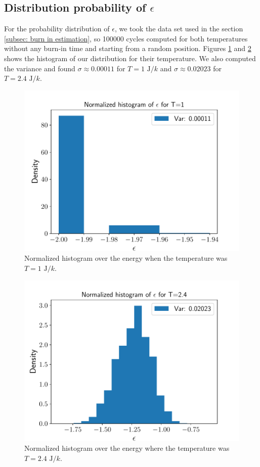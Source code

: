 \documentclass[english,notitlepage,reprint,nofootinbib]{revtex4-2}  %
\begin{document}
	\subsection{Distribution probability of $\epsilon$}\label{subsec:dist probability}

	For the probability distribution of $\epsilon$, we took the data set used in the section
	\ref{subsec: burn in estimation}, so 100000 cycles computed for both temperatures
	without any burn-in time and starting from a random position. Figures \ref{fig:hist1} and \ref{fig:hist2} shows the histogram of our distribution for their temperature.
	We also computed the variance and found $\sigma\approx0.00011$ for $T=1 \text{ J}/k$ and
	$\sigma\approx0.02023$ for $T=2.4 \text{ J}/k$.

	\begin{figure}[h!]
		\centering
		\includegraphics[scale=0.55]{figures/Histo_T1.pdf}
		\caption{Normalized histogram over the energy when the temperature was $T=1 \text{ J}/k$.}
		\label{fig:hist1}
	\end{figure}

	\begin{figure}[h!]
		\centering
		\includegraphics[scale=0.55]{figures/Histo_T2.pdf}
		\caption{Normalized histogram over the energy where the temperature was $T=2.4 \text{ J}/k$.}
		\label{fig:hist2}
	\end{figure}
\end{document}
